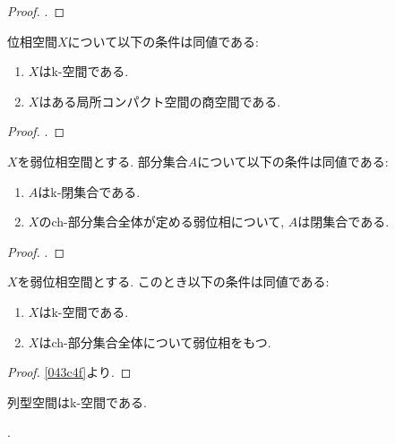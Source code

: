 \documentclass[uplatex, dvipdfmx, a4paper, 12pt, class=jsbook, crop=false]{standalone}
\begin{document}
\begin{proof}
	\WIP.
\end{proof}

\begin{proposition}
	位相空間$X$について以下の条件は同値である:
	\begin{enumerate}
		\item $X$はk-空間である.
		\item $X$はある局所コンパクト\Hausdorff 空間の商空間である.
	\end{enumerate}
\end{proposition}

\begin{proof}
	\WIP.
\end{proof}

\begin{proposition}
	\label{043c4f}
	$X$を弱\Hausdorff 位相空間とする.
	部分集合$A$について以下の条件は同値である:
	\begin{enumerate}
		\item $A$はk-閉集合である.
		\item $X$のch-部分集合全体が定める弱位相について, $A$は閉集合である.
	\end{enumerate}
\end{proposition}

\begin{proof}
	\WIP.
\end{proof}

\begin{corollary}
	$X$を弱\Hausdorff 位相空間とする.
	このとき以下の条件は同値である:
	\begin{enumerate}
		\item $X$はk-空間である.
		\item $X$はch-部分集合全体について弱位相をもつ.
	\end{enumerate}
\end{corollary}

\begin{proof}
	\cref{043c4f}より.
\end{proof}

\begin{proposition}
	列型\Hausdorff 空間はk-空間である.
\end{proposition}

\begin{proposition}
	\WIP.
\end{proposition}
\end{document}
